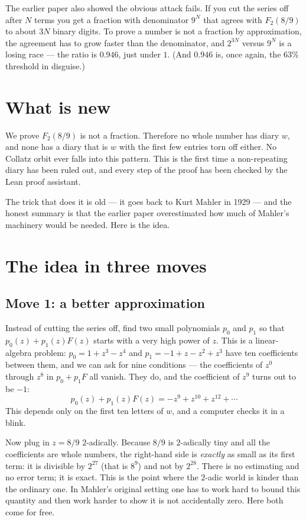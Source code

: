 \documentclass[11pt]{article}
\begin{document}
The earlier paper also showed the obvious attack fails. If you cut the
series off after $N$ terms you get a fraction with denominator $9^N$
that agrees with $F_2(8/9)$ to about $3N$ binary digits. To prove a
number is not a fraction by approximation, the agreement has to grow
faster than the denominator, and $2^{3N}$ versus $9^N$ is a losing
race --- the ratio is $0.946$, just under $1$. (And $0.946$ is, once
again, the $63\%$ threshold in disguise.)

\section{What is new}

We prove $F_2(8/9)$ is not a fraction. Therefore no whole number has
diary $w$, and none has a diary that is $w$ with the first few entries
torn off either. No Collatz orbit ever falls into this pattern. This
is the first time a non-repeating diary has been ruled out, and every
step of the proof has been checked by the Lean proof assistant.

The trick that does it is old --- it goes back to Kurt Mahler in 1929
--- and the honest summary is that the earlier paper overestimated
how much of Mahler's machinery would be needed. Here is the idea.

\section{The idea in three moves}

\subsection*{Move 1: a better approximation}

Instead of cutting the series off, find two small polynomials $p_0$
and $p_1$ so that $p_0(z) + p_1(z)F(z)$ starts with a very high power
of $z$. This is a linear-algebra problem: $p_0 = 1 + z^3 - z^4$ and
$p_1 = -1 + z - z^2 + z^3$ have ten coefficients between them, and we
can ask for nine conditions --- the coefficients of $z^0$ through
$z^8$ in $p_0 + p_1 F$ all vanish. They do, and the coefficient of
$z^9$ turns out to be $-1$:
\[
p_0(z) + p_1(z) F(z) = -z^9 + z^{10} + z^{12} + \cdots
\]
This depends only on the first ten letters of $w$, and a computer
checks it in a blink.

Now plug in $z = 8/9$ $2$-adically. Because $8/9$ is $2$-adically tiny
and all the coefficients are whole numbers, the right-hand side is
\emph{exactly} as small as its first term: it is divisible by
$2^{27}$ (that is $8^9$) and not by $2^{28}$. There is no estimating
and no error term; it is exact. This is the point where the $2$-adic
world is kinder than the ordinary one. In Mahler's original setting
one has to work hard to bound this quantity and then work harder to
show it is not accidentally zero. Here both come for free.
\end{document}
